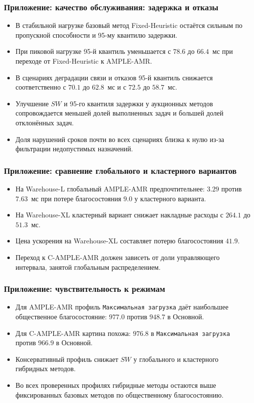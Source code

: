 \begin{frame}
	\frametitle{Приложение: качество обслуживания: задержка и отказы}
	\small
	\begin{itemize}
		\item В стабильной нагрузке базовый метод Fixed-Heuristic остаётся сильным по пропускной способности и 95-му квантилю задержки.
		\item При пиковой нагрузке 95-й квантиль уменьшается с $78.6$ до $66.4$~мс при переходе от Fixed-Heuristic к AMPLE-AMR.
		\item В сценариях деградации связи и отказов 95-й квантиль снижается соответственно с $70.1$ до $62.8$~мс и с $72.5$ до $58.7$~мс.
		\item Улучшение $SW$ и 95-го квантиля задержки у аукционных методов сопровождается меньшей долей выполненных задач и большей долей отклонённых задач.
		\item Доля нарушений сроков почти во всех сценариях близка к нулю из-за фильтрации недопустимых назначений.
	\end{itemize}
\end{frame}

\begin{frame}[shrink=5]
    \frametitle{Приложение: сравнение глобального и кластерного вариантов}
    \small
    \begin{center}
    \end{center}
	\begin{itemize}
	    \item На Warehouse-L глобальный AMPLE-AMR предпочтительнее: $3.29$ против $7.63$~мс при потере благосостояния $9.0$ у кластерного варианта.
	    \item На Warehouse-XL кластерный вариант снижает накладные расходы с $264.1$ до $51.3$~мс.
	    \item Цена ускорения на Warehouse-XL составляет потерю благосостояния $41.9$.
	    \item Переход к C-AMPLE-AMR должен зависеть от доли управляющего интервала, занятой глобальным распределением.
    \end{itemize}
\end{frame}

\begin{frame}
    \frametitle{Приложение: чувствительность к режимам}
    \small
    \begin{itemize}
        \item Для AMPLE-AMR профиль \texttt{Максимальная загрузка} даёт наибольшее общественное благосостояние: $977.0$ против $948.7$ в Основной.
        \item Для C-AMPLE-AMR картина похожа: $976.8$ в \texttt{Максимальная загрузка} против $966.9$ в Основной.
        \item Консервативный профиль снижает $SW$ у глобального и кластерного гибридных методов.
        \item Во всех проверенных профилях гибридные методы остаются выше фиксированных базовых методов по общественному благосостоянию.
    \end{itemize}
\end{frame}
